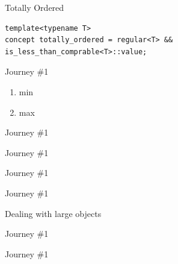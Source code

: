 \documentclass[10pt]{beamer}
\begin{document}
\begin{frame}[fragile]{Totally Ordered}
\begin{lstlisting}[style=cpp]
template<typename T>
concept totally_ordered = regular<T> && is_less_than_comprable<T>::value;

\end{lstlisting}
\end{frame}


\begin{frame}{Journey \#1}
    \begin{enumerate}
        \item min
        \item max
    \end{enumerate}
\end{frame}

\begin{frame}{Journey \#1}
    \begin{block}{}
		
	\end{block}
\end{frame}

\begin{frame}{Journey \#1}
    \begin{block}{}
		
	\end{block}
\end{frame}


\begin{frame}{Journey \#1}
    \begin{block}{}
		
	\end{block}
\end{frame}

\begin{frame}{Journey \#1}
    \begin{block}{Dealing with large objects}
		
	\end{block}
\end{frame}

\begin{frame}{Journey \#1}
    \begin{block}{}
		
	\end{block}
\end{frame}

\begin{frame}{Journey \#1}
    \begin{block}{}
		
	\end{block}
\end{frame}
\end{document}
